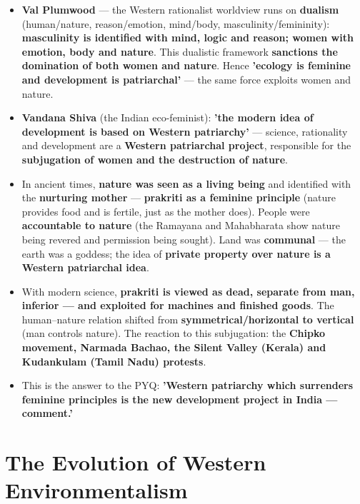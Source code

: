 \begin{KeyConcept}
\begin{itemize}
\item \textbf{Val Plumwood} --- the Western rationalist worldview runs on \textbf{dualism} (human/nature, reason/emotion, mind/body, masculinity/femininity): \textbf{masculinity is identified with mind, logic and reason; women with emotion, body and nature}. This dualistic framework \textbf{sanctions the domination of both women and nature}. Hence \textbf{'ecology is feminine and development is patriarchal'} --- the same force exploits women and nature.
\item \textbf{Vandana Shiva} (the Indian eco-feminist): \textbf{'the modern idea of development is based on Western patriarchy'} --- science, rationality and development are a \textbf{Western patriarchal project}, responsible for the \textbf{subjugation of women and the destruction of nature}.
\item In ancient times, \textbf{nature was seen as a living being} and identified with the \textbf{nurturing mother} --- \textbf{prakriti as a feminine principle} (nature provides food and is fertile, just as the mother does). People were \textbf{accountable to nature} (the Ramayana and Mahabharata show nature being revered and permission being sought). Land was \textbf{communal} --- the earth was a goddess; the idea of \textbf{private property over nature is a Western patriarchal idea}.
\item With modern science, \textbf{prakriti is viewed as dead, separate from man, inferior --- and exploited for machines and finished goods}. The human--nature relation shifted from \textbf{symmetrical/horizontal to vertical} (man controls nature). The reaction to this subjugation: the \textbf{Chipko movement, Narmada Bachao, the Silent Valley (Kerala) and Kudankulam (Tamil Nadu) protests}.
\item This is the answer to the PYQ: \textbf{'Western patriarchy which surrenders feminine principles is the new development project in India --- comment.'}
\end{itemize}
\end{KeyConcept}

\section{The Evolution of Western Environmentalism}

